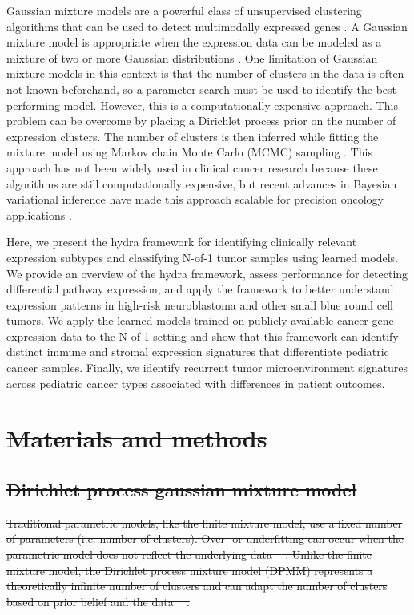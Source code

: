 \documentclass[10pt,letterpaper]{article}
\providecommand{\DIFdeltex}[1]{{\protect\color{red}\sout{#1}}}                      %
\providecommand{\DIFdelbegin}{} %
\providecommand{\DIFdel}[1]{\texorpdfstring{\DIFdeltex{#1}}{}} %
\newcommand{\DIFscaledelfig}{0.5}
\newlength{\DIFdelgraphicswidth} %
\newlength{\DIFdelgraphicsheight} %
\newcommand{\DIFdelincludegraphics}[2][]{%
\sbox{\DIFdelgraphicsbox}{\DIFOincludegraphics[#1]{#2}}%
\settoboxwidth{\DIFdelgraphicswidth}{\DIFdelgraphicsbox} %
\settoboxtotalheight{\DIFdelgraphicsheight}{\DIFdelgraphicsbox} %
\scalebox{\DIFscaledelfig}{%
\parbox[b]{\DIFdelgraphicswidth}{\usebox{\DIFdelgraphicsbox}\\[-\baselineskip] \rule{\DIFdelgraphicswidth}{0em}}\llap{\resizebox{\DIFdelgraphicswidth}{\DIFdelgraphicsheight}{%
\setlength{\unitlength}{\DIFdelgraphicswidth}%
\begin{picture}(1,1)%
\thicklines\linethickness{2pt} %
{\color[rgb]{1,0,0}\put(0,0){\framebox(1,1){}}}%
{\color[rgb]{1,0,0}\put(0,0){\line( 1,1){1}}}%
{\color[rgb]{1,0,0}\put(0,1){\line(1,-1){1}}}%
\end{picture}%
}\hspace*{3pt}}} %
} %
\DeclareRobustCommand{\DIFdelbegin}{\DIFOdelbegin \let\includegraphics\DIFdelincludegraphics} %
\begin{document}
Gaussian mixture models are a powerful class of unsupervised clustering algorithms that can be used to detect multimodally expressed genes \cite{ghoshMixtureModelsAssessing2004,dahlModelBasedClusteringExpression2006,kimVariableSelectionClustering2006}. A Gaussian mixture model is appropriate when the expression data can be modeled as a mixture of two or more Gaussian distributions \cite{gelmanBayesianDataAnalysis2013}. One limitation of Gaussian mixture models in this context is that the number of clusters in the data is often not known beforehand, so a parameter search must be used to identify the best-performing model. However, this is a computationally expensive approach. This problem can be overcome by placing a Dirichlet process prior on the number of expression clusters. The number of clusters is then inferred while fitting the mixture model using Markov chain Monte Carlo (MCMC) sampling \cite{gelmanBayesianDataAnalysis2013}. This approach has not been widely used in clinical cancer research because these algorithms are still computationally expensive, but recent advances in Bayesian variational inference have made this approach scalable for precision oncology applications \cite{thallBayesianNonparametricStatistics2017}.

Here, we present the hydra framework for identifying clinically relevant expression subtypes and classifying N-of-1 tumor samples using learned models. We provide an overview of the hydra framework, assess performance for detecting differential pathway expression, and apply the framework to better understand expression patterns in high-risk neuroblastoma and other small blue round cell tumors. We apply the learned models trained on publicly available cancer gene expression data to the N-of-1 setting and show that this framework can identify distinct immune and stromal expression signatures that differentiate pediatric cancer samples. Finally, we identify recurrent tumor microenvironment signatures across pediatric cancer types associated with differences in patient outcomes.

\DIFdelbegin \section*{\DIFdel{Materials and methods}}
\subsection*{\DIFdel{Dirichlet process gaussian mixture model}}
\DIFdel{Traditional parametric models, like the finite mixture model, use a fixed number of parameters (i.e. number of clusters). Over- or underfitting can occur when the parametric model does not reflect the underlying data \mbox{%
\cite{teh2010dirichlet}}\hspace{0pt}%
. Unlike the finite mixture model, the Dirichlet process mixture model (DPMM) represents a theoretically infinite number of clusters and can adapt the number of clusters based on prior belief and the data \mbox{%
\cite{gelmanBayesianDataAnalysis2013, antoniakMixturesDirichletProcesses1974, teh2010dirichlet}}\hspace{0pt}%
.
}%
\end{document}
